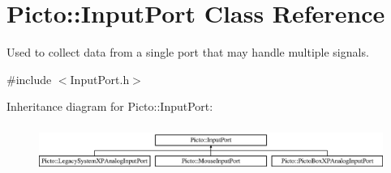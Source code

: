 \hypertarget{class_picto_1_1_input_port}{\section{Picto\-:\-:Input\-Port Class Reference}
\label{class_picto_1_1_input_port}
}


Used to collect data from a single port that may handle multiple signals.  




{\ttfamily \#include $<$Input\-Port.\-h$>$}

Inheritance diagram for Picto\-:\-:Input\-Port\-:\begin{figure}[H]
\begin{center}
\leavevmode
\includegraphics[height=1.536351cm]{class_picto_1_1_input_port}
\end{center}
\end{figure}
